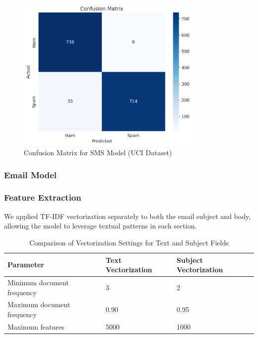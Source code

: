 \documentclass{article}
\begin{document}
\begin{figure}[htbp]
    \centering
    \includegraphics[width=0.8\textwidth]{../analysis/sms/randomforest/uci/confusion_matrix.png}
    \caption{Confusion Matrix for SMS Model (UCI Dataset)}
    \label{fig:confusion_matrix_3}
\end{figure}

\newpage

\subsubsection{Email Model}
\subsubsection*{Feature Extraction}
We applied TF-IDF vectorization separately to both the email subject and body, allowing the model to leverage textual patterns in each section.
\newline

\begin{table}[H]
    \renewcommand{\arraystretch}{1.3}
    \setlength{\tabcolsep}{12pt}
    \centering
    \begin{tabular}{|p{6cm}|p{5cm}|p{4cm}|}
        \hline
        \textbf{Parameter} & \textbf{Text Vectorization} & \textbf{Subject Vectorization} \\
        \hline
        Minimum document frequency & 3 & 2 \\
        \hline
        Maximum document frequency & 0.90 & 0.95 \\
        \hline
        Maximum features & 5000 & 1000 \\
        \hline
    \end{tabular}
    \caption{Comparison of Vectorization Settings for Text and Subject Fields}
    \label{tab:vectorization_settings}
\end{table}
\end{document}
